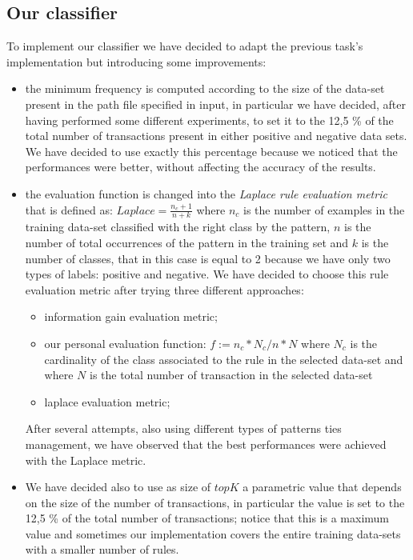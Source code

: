 \documentclass[10pt, a4paper]{article}
\begin{document}
		\subsection{Our classifier}
			To implement our classifier we have decided to adapt the previous task's implementation but introducing some improvements:
			\begin{itemize}
				\item the minimum frequency is computed according to the size of the data-set present in the path file specified in input, in particular we have decided, after having performed some different experiments, to set it to the 12,5 \% of the total number of transactions present in either positive and negative data sets. We have decided to use exactly this percentage because we noticed that the performances were better, without affecting the accuracy of the results.
				\item the evaluation function is changed into the \textit{Laplace rule evaluation metric} that is defined as: $Laplace = \frac{n_c +1}{n + k}$ where $n_c$ is the number of examples in the training data-set classified with the right class by the pattern, $n$ is the number of total occurrences of the pattern in the training set and $k$ is the number of classes, that in this case is equal to 2 because we have only two types of labels: positive and negative.
				We have decided to choose this rule evaluation metric after trying three different approaches:
				\begin{itemize}
					\item information gain evaluation metric;
					\item our personal evaluation function: $f := n_c * N_c / n * N$ where $N_c$ is the cardinality of the class associated to the rule  in the selected data-set and where $N$ is the total number of transaction in the selected data-set 
					\item laplace evaluation metric;
				\end{itemize}
				After several attempts, also using different types of patterns ties management, we have observed that the best performances were achieved with the Laplace metric. 
				\item We have decided also to use as size of $topK$ a parametric value that depends on the size of the number of transactions, in particular the value is set to the 12,5 \% of the total number of transactions; notice that this is a maximum value and sometimes our implementation covers the entire training data-sets with a smaller number of rules.	
			\end{itemize}
			
\end{document}
